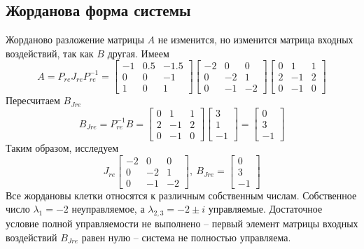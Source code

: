 \documentclass[a4paper, 12pt]{article}
\begin{document}
    \subsection{Жорданова форма системы}
    Жорданово разложение матрицы $A$ не изменится, но изменится матрица входных воздействий, так как $B$ другая.
    Имеем
    $$
    A=P_{re}J_{re}P_{re}^{-1}=\begin{bmatrix}
        -1 &0.5 &-1.5\\
        0 &0 &-1\\
        1 &0 &1
    \end{bmatrix}\begin{bmatrix}
        -2 &0 &0\\
        0 &-2 &1\\
        0 &-1 &-2
    \end{bmatrix}\begin{bmatrix}
        0 &1 &1\\
        2 &-1 &2\\
        0 &-1 &0
    \end{bmatrix}
    $$
    Пересчитаем $B_{Jre}$
    $$
    B_{Jre}=P_{re}^{-1}B=\begin{bmatrix}
        0 &1 &1\\
        2 &-1 &2\\
        0 &-1 &0
    \end{bmatrix}\begin{bmatrix}
        3\\
        1\\
        -1
    \end{bmatrix}=\begin{bmatrix}
        0\\
        3\\
        -1
    \end{bmatrix}
    $$
    Таким образом, исследуем
    $$
    J_{re}\begin{bmatrix}
        -2 &0 &0\\
        0 &-2 &1\\
        0 &-1 &-2
    \end{bmatrix},\ B_{Jre}=\begin{bmatrix}
        0\\
        3\\
        -1
    \end{bmatrix}
    $$
    Все жордановы клетки относятся к различным собственным числам. Собственное число $\lambda_1=-2$ неуправляемое,
    а $\lambda_{2,3}=-2\pm i$ управляемые. Достаточное условие полной управляемости не выполнено -- первый элемент
    матрицы входных воздействий $B_{Jre}$ равен нулю -- система не полностью управляема.
\end{document}
